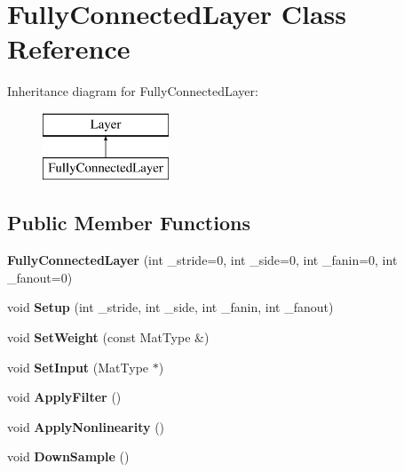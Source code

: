 \hypertarget{class_fully_connected_layer}{\section{Fully\+Connected\+Layer Class Reference}
\label{class_fully_connected_layer}
}
Inheritance diagram for Fully\+Connected\+Layer\+:\begin{figure}[H]
\begin{center}
\leavevmode
\includegraphics[height=2.000000cm]{class_fully_connected_layer}
\end{center}
\end{figure}
\subsection*{Public Member Functions}
\begin{DoxyCompactItemize}
\item 
\hypertarget{class_fully_connected_layer_a1c0e43c6af01641bf2c3be456d1c9eca}{{\bfseries Fully\+Connected\+Layer} (int \+\_\+stride=0, int \+\_\+side=0, int \+\_\+fanin=0, int \+\_\+fanout=0)}\label{class_fully_connected_layer_a1c0e43c6af01641bf2c3be456d1c9eca}

\item 
\hypertarget{class_fully_connected_layer_adba270546f0865b3adfb2739fcd7818e}{void {\bfseries Setup} (int \+\_\+stride, int \+\_\+side, int \+\_\+fanin, int \+\_\+fanout)}\label{class_fully_connected_layer_adba270546f0865b3adfb2739fcd7818e}

\item 
\hypertarget{class_fully_connected_layer_a13326e661fb3459d05653972d8ed0e5c}{void {\bfseries Set\+Weight} (const Mat\+Type \&)}\label{class_fully_connected_layer_a13326e661fb3459d05653972d8ed0e5c}

\item 
\hypertarget{class_fully_connected_layer_abc76d6caa38d466a2b58d824e50a9eb2}{void {\bfseries Set\+Input} (Mat\+Type $\ast$)}\label{class_fully_connected_layer_abc76d6caa38d466a2b58d824e50a9eb2}

\item 
\hypertarget{class_fully_connected_layer_a71b13c03aed1aa3b97920279e3534f7b}{void {\bfseries Apply\+Filter} ()}\label{class_fully_connected_layer_a71b13c03aed1aa3b97920279e3534f7b}

\item 
\hypertarget{class_fully_connected_layer_aeaa164864cf41ae5fe116cf8533a1817}{void {\bfseries Apply\+Nonlinearity} ()}\label{class_fully_connected_layer_aeaa164864cf41ae5fe116cf8533a1817}

\item 
\hypertarget{class_fully_connected_layer_ae769cfe87e16198f8b0959f87bfb3100}{void {\bfseries Down\+Sample} ()}\label{class_fully_connected_layer_ae769cfe87e16198f8b0959f87bfb3100}

\end{DoxyCompactItemize}
